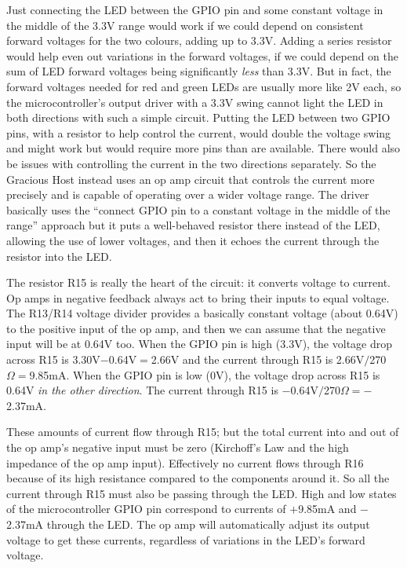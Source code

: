Just connecting the LED between the GPIO pin and some constant voltage in
the middle of the 3.3V range would work if we could depend on consistent
forward voltages for the two colours, adding up to 3.3V.  Adding a series
resistor would help even out variations in the forward voltages, if we could
depend on the sum of LED forward voltages being significantly \emph{less}
than 3.3V.  But in fact, the forward voltages needed for red and green LEDs
are usually more like 2V each, so the microcontroller's output driver with a
3.3V swing cannot light the LED in both directions with such a simple
circuit.  Putting the LED between two GPIO pins, with a resistor to help
control the current, would double the voltage swing and might work but would
require more pins than are available.  There would also be issues with
controlling the current in the two directions separately.  So the Gracious
Host instead uses an op amp circuit that controls the current more precisely
and is capable of operating over a wider voltage range.  The driver
basically uses the ``connect GPIO pin to a constant voltage in the middle of
the range'' approach but it puts a well-behaved resistor there instead of
the LED, allowing the use of lower voltages, and then it echoes the current
through the resistor into the LED.

The resistor R15 is really the heart of the circuit:  it converts voltage to
current.  Op amps in negative feedback always act to bring their inputs to
equal voltage.  The R13/R14 voltage divider provides a basically constant
voltage (about 0.64V) to the positive input of the op amp, and then we can
assume that the negative input will be at 0.64V too.  When the GPIO pin is
high (3.3V), the voltage drop across R15 is 3.30V$-$0.64V$=$2.66V and the
current through R15 is 2.66V$/$270$\Omega=$9.85mA.  When the GPIO pin is low
(0V), the voltage drop across R15 is 0.64V \emph{in the other direction}. 
The current through R15 is $-$0.64V$/$270$\Omega=-$2.37mA.

These amounts of current flow through R15; but the total current into and
out of the op amp's negative input must be zero (Kirchoff's Law and the high
impedance of the op amp input).  Effectively no current flows through R16
because of its high resistance compared to the components around it.  So all
the current through R15 must also be passing through the LED.  High and low
states of the microcontroller GPIO pin correspond to currents of $+$9.85mA
and $-$2.37mA through the LED.  The op amp will automatically adjust its
output voltage to get these currents, regardless of variations in the LED's
forward voltage.

